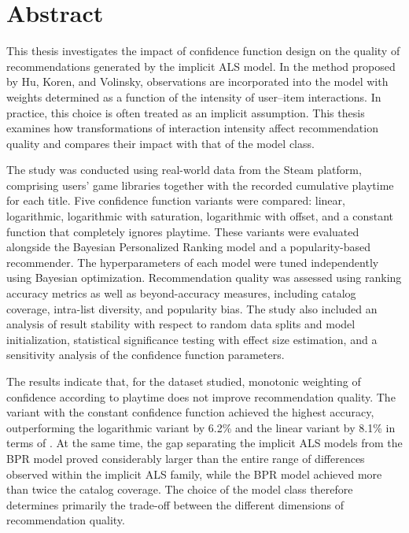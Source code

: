 \chapter*{Abstract}

This thesis investigates the impact of confidence function design on the quality of recommendations generated by the implicit ALS model. In the method proposed by Hu, Koren, and Volinsky, observations are incorporated into the model with weights determined as a function of the intensity of user--item interactions. In practice, this choice is often treated as an implicit assumption. This thesis examines how transformations of interaction intensity affect recommendation quality and compares their impact with that of the model class.

The study was conducted using real-world data from the Steam platform, comprising users' game libraries together with the recorded cumulative playtime for each title. Five confidence function variants were compared: linear, logarithmic, logarithmic with saturation, logarithmic with offset, and a constant function that completely ignores playtime. These variants were evaluated alongside the Bayesian Personalized Ranking model and a popularity-based recommender. The hyperparameters of each model were tuned independently using Bayesian optimization. Recommendation quality was assessed using ranking accuracy metrics as well as beyond-accuracy measures, including catalog coverage, intra-list diversity, and popularity bias. The study also included an analysis of result stability with respect to random data splits and model initialization, statistical significance testing with effect size estimation, and a sensitivity analysis of the confidence function parameters.

The results indicate that, for the dataset studied, monotonic weighting of confidence according to playtime does not improve recommendation quality. The variant with the constant confidence function achieved the highest accuracy, outperforming the logarithmic variant by 6.2\% and the linear variant by 8.1\% in terms of \ndcg{}. At the same time, the gap separating the implicit ALS models from the BPR model proved considerably larger than the entire range of differences observed within the implicit ALS family, while the BPR model achieved more than twice the catalog coverage. The choice of the model class therefore determines primarily the trade-off between the different dimensions of recommendation quality.


